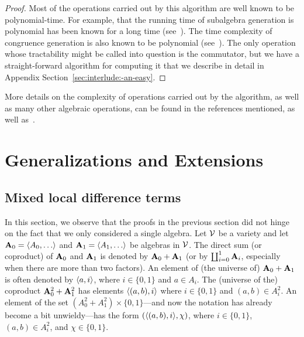 \begin{proof}
    Most of the operations carried out by this algorithm are well known to be
    polynomial-time.  For example, that the running time of subalgebra generation is
    polynomial has been known for a long time (see~\cite{MR0455543}).
    The time complexity of congruence generation is also known to be polynomial
    (see~\cite{MR2470585}).  The only operation whose tractability might be 
    called into question is the commutator, but we have a straight-forward 
    algorithm for computing it that we describe in detail in 
    Appendix Section~\ref{sec:interlude:-an-easy}.
\end{proof}


More details on the complexity of operations carried out by the algorithm, as well as many other algebraic operations, can be found in the references mentioned, as well as~\cite{MR1871085,MR1695293,Freese:2009}. 


\section{Generalizations and Extensions}


\subsection{Mixed local difference terms}
\label{sec:mixed-local-diff}
In this section, we observe that the proofs in the previous section
did not hinge on the fact that we only considered a single algebra.  
Let $\mathcal{V}$ be a variety and let $\bA_0=\< A_0, \dots\>$ and  $\bA_1=\< A_1, \dots\>$ be
algebras in $\mathcal{V}$.
The direct sum (or coproduct) of $\mathbf{A}_0$ and
$\mathbf{A}_1$ is denoted by $\mathbf{A}_0 + \mathbf{A}_1$
(or by $\coprod_{i=0}^1 \mathbf{A}_i$, especially when there are more than two
factors).
An element of (the universe of)
$\mathbf{A}_0 + \mathbf{A}_1$ is often denoted by $\langle a, i\rangle$,
where $i\in \{0,1\}$ and $a \in A_i$.
The (universe of the) coproduct %
$\mathbf{A}_0^2 + \mathbf{A}_1^2$ has elements
$\langle(a,b), i\rangle$ where $i\in \{0,1\}$ and $(a,b) \in A_i^2$.
An element of  the set $(A_0^2 + A_1^2) \times \{0,1\}$---and
now the notation has already become a bit unwieldy---has
the form $(\langle(a,b), i\rangle, \chi)$, where $i\in \{0,1\}$, $(a,b) \in A_i^2$,
and $\chi\in \{0,1\}$. 

